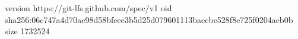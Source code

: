 version https://git-lfs.github.com/spec/v1
oid sha256:06c747a4d70ae98d58bfeee3b5d25d079601113baecbe528f8e725f0204aeb0b
size 1732524
